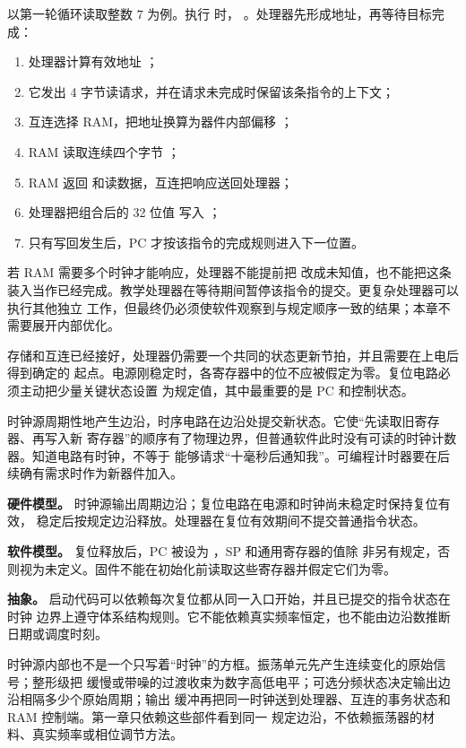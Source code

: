 以第一轮循环读取整数 \(7\) 为例。执行  时，
。处理器先形成地址，再等待目标完成：

\begin{enumerate}
\item 处理器计算有效地址 ；
\item 它发出 4 字节读请求，并在请求未完成时保留该条指令的上下文；
\item 互连选择 RAM，把地址换算为器件内部偏移 ；
\item RAM 读取连续四个字节 ；
\item RAM 返回  和读数据，互连把响应送回处理器；
\item 处理器把组合后的 32 位值  写入 ；
\item 只有写回发生后，PC 才按该指令的完成规则进入下一位置。
\end{enumerate}

若 RAM 需要多个时钟才能响应，处理器不能提前把  改成未知值，也不能把这条
装入当作已经完成。教学处理器在等待期间暂停该指令的提交。更复杂处理器可以执行其他独立
工作，但最终仍必须使软件观察到与规定顺序一致的结果；本章不需要展开内部优化。


存储和互连已经接好，处理器仍需要一个共同的状态更新节拍，并且需要在上电后得到确定的
起点。电源刚稳定时，各寄存器中的位不应被假定为零。复位电路必须主动把少量关键状态设置
为规定值，其中最重要的是 PC 和控制状态。


时钟源周期性地产生边沿，时序电路在边沿处提交新状态。它使“先读取旧寄存器、再写入新
寄存器”的顺序有了物理边界，但普通软件此时没有可读的时钟计数器。知道电路有时钟，不等于
能够请求“十毫秒后通知我”。可编程计时器要在后续确有需求时作为新器件加入。

\textbf{硬件模型。} 时钟源输出周期边沿；复位电路在电源和时钟尚未稳定时保持复位有效，
稳定后按规定边沿释放。处理器在复位有效期间不提交普通指令状态。

\textbf{软件模型。} 复位释放后，PC 被设为 ，SP 和通用寄存器的值除
非另有规定，否则视为未定义。固件不能在初始化前读取这些寄存器并假定它们为零。

\textbf{抽象。} 启动代码可以依赖每次复位都从同一入口开始，并且已提交的指令状态在时钟
边界上遵守体系结构规则。它不能依赖真实频率恒定，也不能由边沿数推断日期或调度时刻。

时钟源内部也不是一个只写着“时钟”的方框。振荡单元先产生连续变化的原始信号；整形级把
缓慢或带噪的过渡收束为数字高低电平；可选分频状态决定输出边沿相隔多少个原始周期；输出
缓冲再把同一时钟送到处理器、互连的事务状态和 RAM 控制端。第一章只依赖这些部件看到同一
规定边沿，不依赖振荡器的材料、真实频率或相位调节方法。

